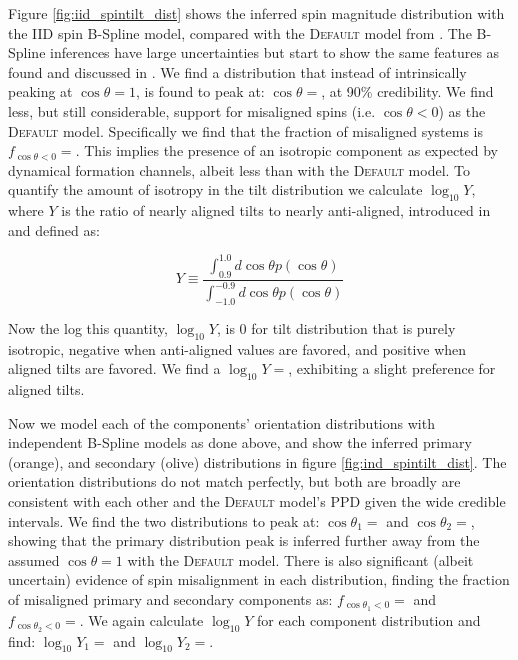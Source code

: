 Figure \ref{fig:iid_spintilt_dist} shows the inferred spin magnitude distribution with the IID spin B-Spline model, compared with the \textsc{Default} model from \citet{o3b_astro_dist}. 
The B-Spline inferences have large uncertainties but start to show the same features as found and discussed in \citet{spinitasyoulike}. 
We find a distribution that instead of intrinsically peaking at $\cos{\theta}=1$, is found to peak at: $\cos{\theta}=$\result{$\CIPlusMinus{\macros[BSplineIIDCompSpins][peakCosTilt]}$}, at 
90\% credibility. We find less, but still considerable, support for misaligned spins (i.e. $\cos{\theta}<0$) as the \textsc{Default} model. Specifically we 
find that the fraction of misaligned systems is $f_{\cos{\theta}<0}=$\result{$\CIPlusMinus{\macros[BSplineIIDCompSpins][negFrac]}$}. This implies 
the presence of an isotropic component as expected by dynamical formation channels, albeit less than with the \textsc{Default} model. To quantify the 
amount of isotropy in the tilt distribution we calculate $\log_{10}Y$, where $Y$ is the ratio of nearly aligned tilts to nearly anti-aligned, 
introduced in \citet{spinitasyoulike} and defined as:

\begin{equation}
    Y \equiv \frac{\int_{0.9}^{1.0} d\cos{\theta} p(\cos{\theta})}{\int_{-1.0}^{-0.9} d\cos{\theta} p(\cos{\theta})}
\end{equation}

\noindent Now the log this quantity, $\log_{10}Y$, is 0 for tilt distribution that is purely isotropic, negative when anti-aligned values are favored, 
and positive when aligned tilts are favored. We find a $\log_{10}Y=$, exhibiting a 
slight preference for aligned tilts.  

Now we model each of the components' orientation distributions with independent B-Spline models as done above, and show the inferred 
primary (orange), and secondary (olive) distributions in figure \ref{fig:ind_spintilt_dist}. The orientation distributions do not match perfectly, but both are broadly
are consistent with each other and the \textsc{Default} model's PPD given the wide credible intervals. We find the two distributions to peak at: $\cos{\theta_1}=$\result{$\CIPlusMinus{\macros[BSplineIndependentCompSpins][peakCosTilt1]}$} 
and $\cos{\theta_2}=$\result{$\CIPlusMinus{\macros[BSplineIndependentCompSpins][peakCosTilt2]}$}, showing that the primary distribution peak is inferred further away 
from the assumed $\cos{\theta}=1$ with the \textsc{Default} model. There is also significant (albeit uncertain) evidence of spin misalignment in each distribution, finding 
the fraction of misaligned primary and secondary components as: $f_{\cos{\theta_1}<0}=$\result{$\CIPlusMinus{\macros[BSplineIndependentCompSpins][negFrac1]}$} and 
$f_{\cos{\theta_2}<0}=$\result{$\CIPlusMinus{\macros[BSplineIndependentCompSpins][negFrac2]}$}. We again calculate $\log_{10}Y$  
for each component distribution and find: $\log_{10}Y_1=$ and 
$\log_{10}Y_2=$.

